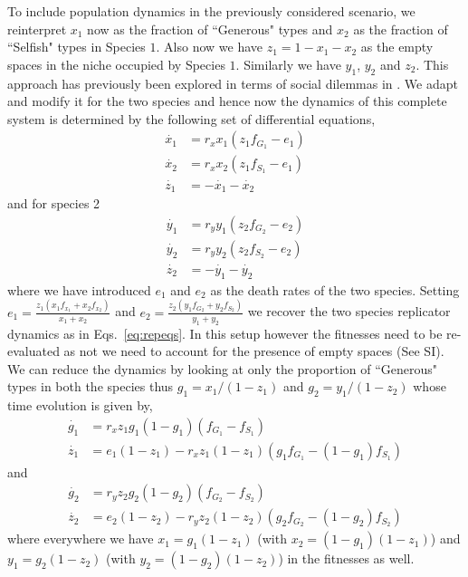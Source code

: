 \documentclass{pnastwo}
\begin{document}
\begin{article}
To include population dynamics in the previously considered scenario, we reinterpret $x_1$ now as the fraction of ``Generous" types and $x_2
$ as the fraction of ``Selfish" types in Species $1$.
Also now we have $z_1 = 1 - x_1 - x_2$ as the empty spaces in the niche occupied by Species $1$. Similarly we have $y_1$, $y_2$ and $z_2$.
This approach has previously been explored in terms of social dilemmas in \cite{hauert:PRSB:2006}.
We adapt and modify it for the two species and hence now the dynamics of this complete system is determined by the following set of differential equations,
%
\begin{align}
	\dot{x_1} &= r_x x_1 (z_1 f_{G_1} - e_1) \nonumber \\
	\dot{x_2} &= r_x x_2 (z_1 f_{S_1} - e_1) \\
	\dot{z_1} &= - \dot{x_1} - \dot{x_2} \nonumber
\end{align}
%
and for species 2
\begin{align}
	\dot{y_1} &= r_y y_1 (z_2 f_{G_2} - e_2) \nonumber \\
	\dot{y_2} &= r_y y_2 (z_2 f_{S_2} - e_2) \\
	\dot{z_2} &= - \dot{y_1} - \dot{y_2} \nonumber
\end{align}
%
where we have introduced $e_1$ and $e_2$ as the death rates of the two species.
Setting $e_1 = \frac{z_1 (x_1 f_{x_1} + x_2 f_{x_2}) }{x_1 + x_2}$ and $e_2 = \frac{z_2 (y_1 f_{G_2} + y_2 f_{S_2}) }{y_1 + y_2}$ we recover the two species replicator dynamics as in Eqs.~\ref{eq:repeqs}.
In this setup however the fitnesses need to be re-evaluated as not we need to account for the presence of empty spaces (See SI).
We can reduce the dynamics by looking at only the proportion of ``Generous" types in both the species thus $g_1 = x_1/(1-z_1)$ and $g_2 = y_1/(1-z_2)$ whose time evolution is given by,
\begin{align}
	\dot{g_1} &= r_x z_1 g_1 (1-g_1) (f_{G_1} - f_{S_1}) \nonumber \\
	\dot{z_1} &= e_1 (1-z_1) - r_x z_1 (1-z_1) (g_1 f_{G_1} -  (1-g_1) f_{S_1})
\end{align}
and
\begin{align}
	\dot{g_2} &= r_y z_2 g_2 (1-g_2) (f_{G_2} - f_{S_2}) \nonumber \\
	\dot{z_2} &= e_2 (1-z_2) - r_y z_2 (1-z_2) (g_2 f_{G_2} -  (1-g_2) f_{S_2})
\end{align}
%
where everywhere we have $x_1 = g_1 (1-z_1)$ (with $x_2 = (1-g_1) (1-z_1)$) and $y_1 = g_2 (1-z_2)$ (with $y_2 = (1-g_2) (1-z_2)$) in the fitnesses as well.


\end{article}
\end{document}
